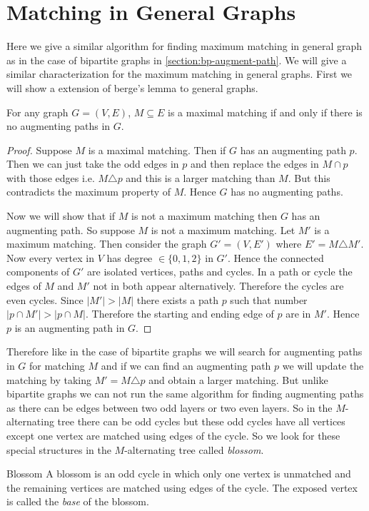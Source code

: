 \section{Matching in General Graphs}
Here we give a similar algorithm for finding maximum matching in general graph as in the case of bipartite graphs in \autoref{section:bp-augment-path}. We will give a similar characterization for the maximum matching in general graphs. First we will show a extension of berge's lemma to general graphs.
\begin{Theorem}{}{}
	For any graph $G=(V,E)$, $M\subseteq E$ is a maximal matching if and only if there is no augmenting paths in $G$.
\end{Theorem}
\begin{proof}
	Suppose $M$ is a maximal matching. Then if $G$ has an augmenting path $p$. Then we can just take the odd edges in $p$ and then replace the edges in $M\cap p$ with those edges i.e. $M\triangle p$ and this is a larger matching than $M$. But this contradicts the maximum property of $M$. Hence $G$ has no augmenting paths.
	
	Now we will show that if $M$ is not a maximum matching then $G$ has an augmenting path. So suppose $M$ is not a maximum matching. Let $M'$ is a maximum matching. Then consider the graph $G'=(V,E')$ where $E'=M\triangle M'$. Now every vertex in $V$ has degree $\in \{0,1,2\}$ in $G'$. Hence the connected components of $G'$ are isolated vertices, paths and cycles. In a path or cycle the edges of $M$ and $M'$ not in both appear alternatively. Therefore the cycles are even cycles. Since $|M'|>|M|$ there exists a path $p$ such that number $|p\cap M'|>|p\cap M|$. Therefore the starting and ending edge of $p$ are in $M'$. Hence $p$ is an augmenting path in $G$. 
\end{proof}

Therefore like in the case of bipartite graphs we will search for augmenting paths in $G$ for matching $M$ and if we can find an augmenting path $p$ we will update the matching by taking $M'=M\triangle p$ and obtain a larger matching. But unlike bipartite graphs we can not run the same algorithm for finding augmenting paths as there can be edges between two odd layers or two even layers. So in the $M$-alternating tree there can be odd cycles but these odd cycles have all vertices except one vertex are matched using edges of the cycle. So we look for these special structures in the $M$-alternating tree called \textit{blossom}.
\begin{Definition}{Blossom}{}
	A blossom is an odd cycle in which only one vertex is unmatched and the remaining vertices are matched using  edges of the cycle. 	The exposed vertex is called the \textit{base} of the blossom.
\end{Definition}

